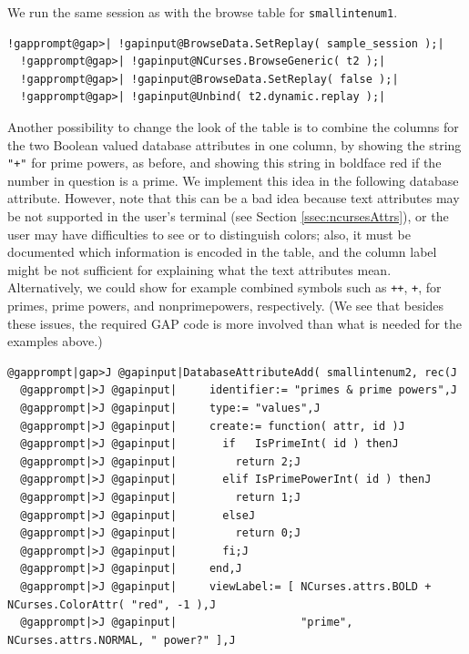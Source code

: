 \documentclass[a4paper,11pt]{report}
\begin{document}
{{\begin{Verbatim}[commandchars=@|G,fontsize=\small,frame=single,label=Example]
\end{Verbatim}
 We run the same session as with the browse table for \texttt{smallintenum1}. 
\begin{Verbatim}[commandchars=!@|,fontsize=\small,frame=single,label=Example]
  !gapprompt@gap>| !gapinput@BrowseData.SetReplay( sample_session );|
  !gapprompt@gap>| !gapinput@NCurses.BrowseGeneric( t2 );|
  !gapprompt@gap>| !gapinput@BrowseData.SetReplay( false );|
  !gapprompt@gap>| !gapinput@Unbind( t2.dynamic.replay );|
\end{Verbatim}
 Another possibility to change the look of the table is to combine the columns
for the two Boolean valued database attributes in one column, by showing the
string \texttt{"+"} for prime powers, as before, and showing this string in boldface red if the
number in question is a prime. We implement this idea in the following
database attribute. However, note that this can be a bad idea because text
attributes may be not supported in the user's terminal (see Section \ref{ssec:ncursesAttrs}), or the user may have difficulties to see or to distinguish colors; also, it
must be documented which information is encoded in the table, and the column
label might be not sufficient for explaining what the text attributes mean.
Alternatively, we could show for example combined symbols such as \texttt{++}, \texttt{+\texttt{}}, \texttt{\texttt{}\texttt{}} for primes, prime powers, and
non\texttt{}prime\texttt{}powers, respectively. (We see
that besides these issues, the required \textsf{GAP} code is more involved than what is needed for the examples above.) 
\begin{Verbatim}[commandchars=@|J,fontsize=\small,frame=single,label=Example]
  @gapprompt|gap>J @gapinput|DatabaseAttributeAdd( smallintenum2, rec(J
  @gapprompt|>J @gapinput|     identifier:= "primes & prime powers",J
  @gapprompt|>J @gapinput|     type:= "values",J
  @gapprompt|>J @gapinput|     create:= function( attr, id )J
  @gapprompt|>J @gapinput|       if   IsPrimeInt( id ) thenJ
  @gapprompt|>J @gapinput|         return 2;J
  @gapprompt|>J @gapinput|       elif IsPrimePowerInt( id ) thenJ
  @gapprompt|>J @gapinput|         return 1;J
  @gapprompt|>J @gapinput|       elseJ
  @gapprompt|>J @gapinput|         return 0;J
  @gapprompt|>J @gapinput|       fi;J
  @gapprompt|>J @gapinput|     end,J
  @gapprompt|>J @gapinput|     viewLabel:= [ NCurses.attrs.BOLD + NCurses.ColorAttr( "red", -1 ),J
  @gapprompt|>J @gapinput|                   "prime", NCurses.attrs.NORMAL, " power?" ],J

\end{Verbatim}}}
\end{document}
